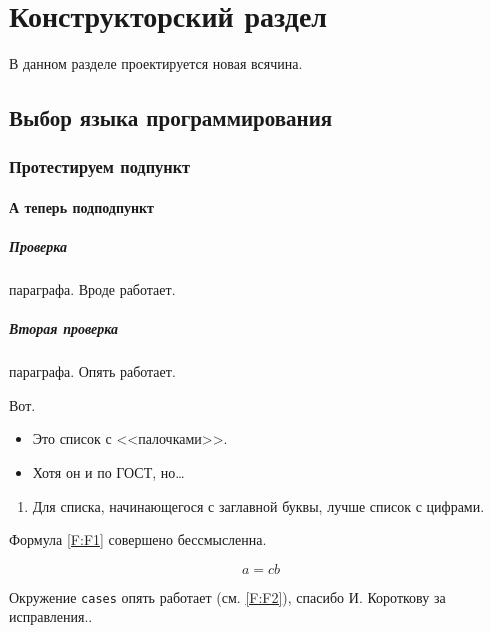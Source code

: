 \chapter{Конструкторский раздел}
\label{cha:design}

В данном разделе проектируется новая всячина.

\section{Выбор языка программирования}

\subsection{Протестируем подпункт}
\subsubsection{А теперь подподпункт}


\paragraph{Проверка} параграфа. Вроде работает.
\paragraph{Вторая проверка} параграфа. Опять работает.

Вот.

\begin{itemize}
\item Это список с <<палочками>>.
\item Хотя он и по ГОСТ, но\dots
\end{itemize}

\begin{enumerate}
\item  Для списка, начинающегося с заглавной буквы, лучше список с цифрами.
\end{enumerate}

Формула \ref{F:F1} совершено бессмысленна.


\begin{equation}
a= cb
\label{F:F1}
\end{equation}


Окружение \texttt{cases} опять работает (см. \ref{F:F2}), спасибо И. Короткову за исправления..


